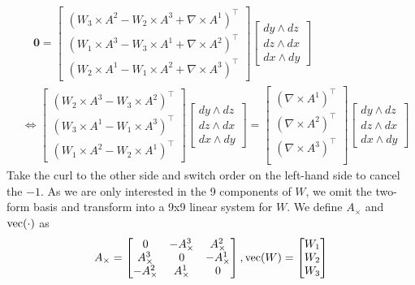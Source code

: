 \documentclass[../thesis.tex]{subfiles}
\begin{document}
\begin{align*}
  & \hspace{1em}\bm{0} = \begin{bmatrix}
    (W_3 \times A^2 - W_2 \times A^3 + \nabla \times A^1)^{\top} \\
    (W_1 \times A^3 - W_3 \times A^1+ \nabla \times A^2)^{\top} \\
    (W_2 \times A^1 - W_1 \times A^2 + \nabla \times A^3)^{\top}
  \end{bmatrix}\begin{bmatrix}
    dy \wedge dz \\ dz \wedge dx \\ dx \wedge dy
  \end{bmatrix} \\
  & \iff 
  \begin{bmatrix}
    (W_2 \times A^3 - W_3 \times A^2)^{\top}  \\ 
    (W_3 \times A^1 - W_1 \times A^3)^{\top}  \\
    (W_1 \times A^2 - W_2 \times A^1)^{\top}
  \end{bmatrix}
  \begin{bmatrix}
    dy \wedge dz \\ dz \wedge dx \\ dx \wedge dy
  \end{bmatrix}
  =
  \begin{bmatrix}
    (\nabla \times A^1)^{\top} \\
    (\nabla \times A^2)^{\top} \\
    (\nabla \times A^3)^{\top} \\
  \end{bmatrix}
  \begin{bmatrix}
    dy \wedge dz \\ dz \wedge dx \\ dx \wedge dy
  \end{bmatrix}
\end{align*}
Take the curl to the other side and switch order on the left-hand side to cancel the $-1$.
As we are only interested in the 9 components of $W$, we omit the
two-form basis and transform into a 9x9 linear system for $W$.
We define $A_{\times}$ and $\operatorname{vec}(\cdot)$ as
$$A_{\times} = \begin{bmatrix}
  0 & -A^3_{\times} & A^2_{\times} \\
  A^3_{\times} & 0 & -A^1_{\times} \\
  -A^2_{\times} & A^1_{\times} & 0
\end{bmatrix},
\operatorname{vec}(W)= \begin{bmatrix}
  W_1 \\ W_2 \\ W_3
\end{bmatrix}$$
\end{document}

